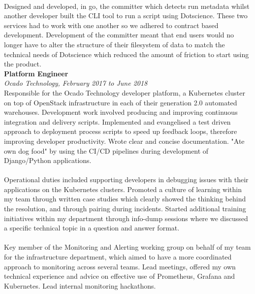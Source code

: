 \documentclass{article}
\begin{document}
\begin{flushleft}
\paragraph{}Designed and developed, in go, the committer which detects run metadata whilst another developer built the CLI tool to run a script using Dotscience. These two services had to work with one another so we adhered to contract based development. Development of the committer meant that end users would no longer have to alter the structure of their filesystem of data to match the technical needs of Dotscience which reduced the amount of friction to start using the product.\\[10pt]

\textbf{Platform Engineer}\\
\textit{Ocado Technology, February 2017 to June 2018}\\[5pt]
Responsible for the Ocado Technology developer platform, a Kubernetes cluster on top of OpenStack infrastructure in each of their generation 2.0 automated warehouses. Development work involved producing and improving continuous integration and delivery scripts. Implemented and evangelised a test driven approach to deployment process scripts to speed up feedback loops, therefore improving developer productivity. Wrote clear and concise documentation. "Ate own dog food" by using the CI/CD pipelines during development of Django/Python applications.

\paragraph{}Operational duties included supporting developers in debugging issues with their applications on the Kubernetes clusters. Promoted a culture of learning within my team through written case studies which clearly showed the thinking behind the resolution, and through pairing during incidents. Started additional training initiatives within my department through info-dump sessions where we discussed a specific technical topic in a question and answer format.

\paragraph{}Key member of the Monitoring and Alerting working group on behalf of my team for the infrastructure department, which aimed to have a more coordinated approach to monitoring across several teams. Lead meetings, offered my own technical experience and advice on effective use of Prometheus, Grafana and Kubernetes. Lead internal monitoring hackathons.


\end{flushleft}
\end{document}
